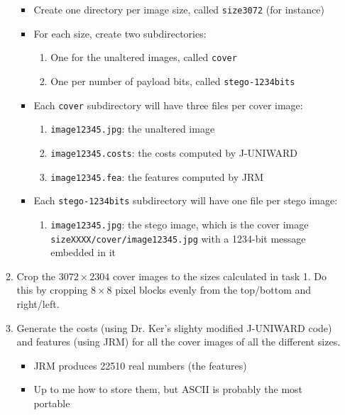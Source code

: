 \documentclass[11pt,a4paper]{report}
\begin{document}
\begin{itemize}
\begin{enumerate}
\begin{itemize}
    \item Create one directory per image size, called \texttt{size3072} (for instance)

    \item For each size, create two subdirectories:
      \begin{enumerate}
      \item One for the unaltered images, called \texttt{cover}
      \item One per number of payload bits, called \texttt{stego-1234bits}
      \end{enumerate}

    \item Each \texttt{cover} subdirectory will have three files per cover image:
      \begin{enumerate}
      \item \texttt{image12345.jpg}: the unaltered image
      \item \texttt{image12345.costs}: the costs computed by J-UNIWARD
      \item \texttt{image12345.fea}: the features computed by JRM
      \end{enumerate}

    \item Each \texttt{stego-1234bits} subdirectory will have one file per stego image:
      \begin{enumerate}
      \item \texttt{image12345.jpg}: the stego image, which is the cover image \texttt{sizeXXXX/cover/image12345.jpg} with a 1234-bit message embedded in it
      \end{enumerate}
    \end{itemize}

  \item Crop the $3072\times2304$ cover images to the sizes calculated in task 1. Do this by cropping $8\times8$ pixel blocks evenly from the top/bottom and right/left.

  \item Generate the costs (using Dr. Ker's slighty modified J-UNIWARD code) and features (using JRM) for all the cover images of all the different sizes.
  \begin{itemize}
  \item JRM produces 22510 real numbers (the features)
  \item Up to me how to store them, but ASCII is probably the most portable
  \end{itemize}


\end{enumerate}
\end{itemize}
\end{document}
